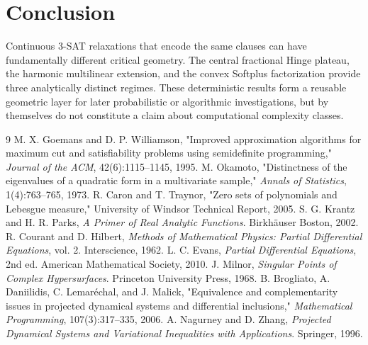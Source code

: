 \documentclass[11pt,a4paper]{article}
\begin{document}
\section{Conclusion}
Continuous 3-SAT relaxations that encode the same clauses can have fundamentally different critical geometry. The central fractional Hinge plateau, the harmonic multilinear extension, and the convex Softplus factorization provide three analytically distinct regimes. These deterministic results form a reusable geometric layer for later probabilistic or algorithmic investigations, but by themselves do not constitute a claim about computational complexity classes.
\begin{thebibliography}{9}
 M. X. Goemans and D. P. Williamson, "Improved approximation algorithms for maximum cut and satisfiability problems using semidefinite programming," \emph{Journal of the ACM}, 42(6):1115--1145, 1995.
 M. Okamoto, "Distinctness of the eigenvalues of a quadratic form in a multivariate sample," \emph{Annals of Statistics}, 1(4):763--765, 1973.
 R. Caron and T. Traynor, "Zero sets of polynomials and Lebesgue measure," University of Windsor Technical Report, 2005.
 S. G. Krantz and H. R. Parks, \emph{A Primer of Real Analytic Functions}. Birkh\"auser Boston, 2002.
 R. Courant and D. Hilbert, \emph{Methods of Mathematical Physics: Partial Differential Equations}, vol. 2. Interscience, 1962.
 L. C. Evans, \emph{Partial Differential Equations}, 2nd ed. American Mathematical Society, 2010.
 J. Milnor, \emph{Singular Points of Complex Hypersurfaces}. Princeton University Press, 1968.
 B. Brogliato, A. Daniilidis, C. Lemar\'echal, and J. Malick, "Equivalence and complementarity issues in projected dynamical systems and differential inclusions," \emph{Mathematical Programming}, 107(3):317--335, 2006.
 A. Nagurney and D. Zhang, \emph{Projected Dynamical Systems and Variational Inequalities with Applications}. Springer, 1996.
\end{thebibliography}
\end{document}

